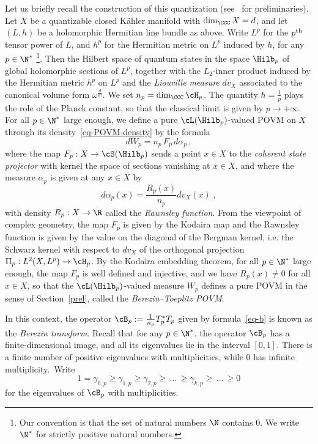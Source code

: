 Let us briefly recall the construction of this quantization (see~\cite{BMS,LF,S} for preliminaries). Let $X$ be a quantizable closed K\"ahler manifold with $\dim_\CCC X=d$, and let $(L,h)$ be a holomorphic Hermitian line bundle as above. Write $L^p$ for the $p^{\rm th}$ tensor power of $L$, and $h^p$ for the Hermitian metric on $L^p$ induced by $h$, for any $p\in\N^*$
\footnote{Our convention is that the set of natural numbers $\N$ contains $0$. We write $\N^*$ for strictly positive natural numbers.}. Then the Hilbert space of quantum states in the space $\Hilb_p$ of global holomorphic sections of $L^p$, together with the $L_2$-inner product induced by the Hermitian metric $h^p$ on $L^p$ and the \emph{Liouville measure} $dv_X$ associated to the canonical volume form $\omega^\frac{d}{d!}$. We set $n_p=\dim_\CCC\cH_p$. The quantity $\hbar=\frac{1}{p}$ plays the role of the Planck constant, so that the classical limit is given by $p \to +\infty$. For all $p\in\N^*$ large enough, we define a pure $\cL(\Hilb_p)$-valued POVM on $X$ through its density~\eqref{eq-POVM-density} by the formula
\begin{equation}\label{BTPOVM}
dW_{p} = n_p\,F_p\,d\alpha_p\,,
\end{equation}
where the map $F_p: X\to \cS(\Hilb_p)$ sends a point $x \in X$ to the \emph{coherent state projector} with kernel the space of sections vanishing at $x\in X$, and where the measure $\alpha_p$ is given at any $x\in X$ by
\begin{equation}\label{eq-alphahbar}
d\alpha_p(x) = \frac{R_p(x)}{n_p}dv_X(x)\;,
\end{equation}
with density $R_p : X \to \R$ called the
\emph{Rawnsley function}. From the viewpoint of complex geometry, the map $F_p$ is given by the Kodaira map and the Rawnsley function is given by the value on the diagonal of the Bergman kernel, i.e. the Schwarz kernel with respect to $dv_X$ of the orthogonal projection $\Pi_p:L^2(X,L^p)\rightarrow\cH_p$. By the Kodaira embedding theorem, for all $p\in\N^*$ large enough, the map $F_p$ is well defined and injective, and we have $R_p(x)\neq 0$ for all $x\in X$, so that the $\cL(\Hilb_p)$-valued measure $W_p$ defines a pure POVM in the sense of Section~\ref{prel}, called the \emph{Berezin--Toeplitz POVM}.

In this context, the operator $\cB_p:= \frac{1}{n_p} T^*_p T_p$ given by formula~\eqref{eq-b} is known as the \emph{Berezin transform}. Recall that for any $p\in\N^*$, the operator $\cB_p$ has a finite-dimensional image, and all its eigenvalues lie in the interval $[0,1]$. There is a finite number of positive eigenvalues with multiplicities,
while $0$ has infinite multiplicity.~Write
\[
1=\gamma_{0,p}
\geq \gamma_{1,p} \geq \gamma_{2,p}\geq\,\dots\,\geq \gamma_{k,p} \geq\,\dots\,\geq 0
\]
for the eigenvalues of $\cB_p$ with multiplicities.

